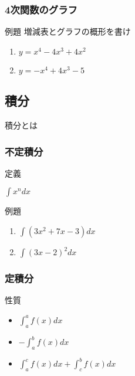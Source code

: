 \documentclass[10pt,dvipdfmx]{jsarticle}
\begin{document}
\subsubsection*{4次関数のグラフ}
\begin{itembox}[l]{例題}
  増減表とグラフの概形を書け
  \begin{large}
    \begin{enumerate}
      \item $y=x^4-4x^3+4x^2$\vspace{15mm}
      \item $y=-x^4+4x^3-5$\vspace{15mm}
    \end{enumerate}
  \end{large}
\end{itembox}


\newpage
\subsection*{積分}
\begin{itembox}[l]{積分とは}
  \vspace{10mm}
\end{itembox}
\subsubsection*{不定積分}
定義
\begin{LARGE}
  $\int x^ndx$
\end{LARGE}
\vspace{8mm}

\begin{itembox}[l]{例題}
  \begin{large}
    \begin{enumerate}
      \item $\int (3x^2+7x-3) dx$
      \item $\int (3x-2)^2dx$
    \end{enumerate}
  \end{large}
\end{itembox}

\subsubsection*{定積分}
性質
\begin{LARGE}
  \begin{itemize}
    \item $\int_{a}^{a}f(x)dx$
    \item $-\int_{a}^{b}f(x)dx$
    \item $\int_{a}^{c}f(x)dx+\int_{c}^{b}f(x)dx$
  \end{itemize}
\end{LARGE}
\end{document}
